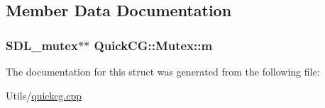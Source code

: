 \subsection{Member Data Documentation}
\hypertarget{structQuickCG_1_1Mutex_a8736e2354b97bb3e754f6376e3d5a001}{
\subsubsection[{m}]{\setlength{\rightskip}{0pt plus 5cm}S\-D\-L\-\_\-mutex$\ast$$\ast$ Quick\-C\-G\-::\-Mutex\-::m}}\label{structQuickCG_1_1Mutex_a8736e2354b97bb3e754f6376e3d5a001}


The documentation for this struct was generated from the following file\-:\begin{DoxyCompactItemize}
\item 
Utils/\hyperlink{quickcg_8cpp}{quickcg.\-cpp}\end{DoxyCompactItemize}
